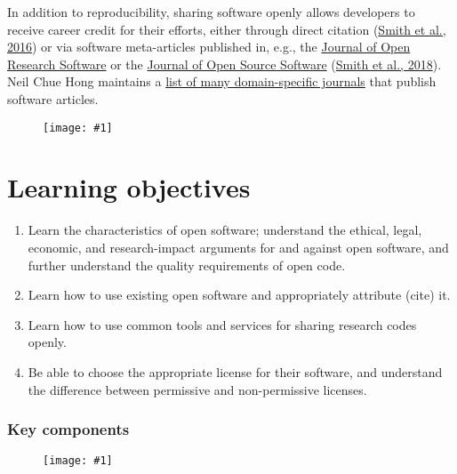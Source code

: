 \documentclass{article}
\newlength{\imgwidth}
\newcommand\scaledgraphics[2]{%
                
\settowidth{\imgwidth}{\texttt{[image: \#1]}}%
                
\setlength{\imgwidth}{\minof{\imgwidth}{#2\textwidth}}%
                
\texttt{[image: \#1]}%
                
}
\begin{document}
In addition to reproducibility, sharing software openly allows developers to receive career credit for their efforts, either through direct citation (\href{https://doi.org/10/bw3g}{Smith et al., 2016}) or via software meta-articles published in, e.g., the \href{http://openresearchsoftware.metajnl.com/}{Journal of Open Research Software} or the \href{http://joss.theoj.org/}{Journal of Open Source Software} (\href{https://doi.org/10/gc5sjf}{Smith et al., 2018}). Neil Chue Hong maintains a \href{https://www.software.ac.uk/which-journals-should-i-publish-my-software}{list of many domain-specific journals} that publish software articles.

\begin{figure}
\scaledgraphics{9209bd39-910a-46c7-a66a-21a7bbfcd5f7.png}{1}
\label{F98258621}
\end{figure}


\section{Learning objectives}\label{learning-objectives}


\begin{enumerate}
\item Learn the characteristics of open software; understand the ethical, legal, economic, and research-impact arguments for and against open software, and further understand the quality requirements of open code.


\item Learn how to use existing open software and appropriately attribute (cite) it.


\item Learn how to use common tools and services for sharing research codes openly.


\item Be able to choose the appropriate license for their software, and understand the difference between permissive and non-permissive licenses.


\end{enumerate}

\subsubsection{Key components}\label{key-components}


\begin{figure}
\scaledgraphics{27d237d8-8f65-4eb1-9c68-f087921c61b9.png}{1}
\label{F66966381}
\end{figure}
\end{document}
